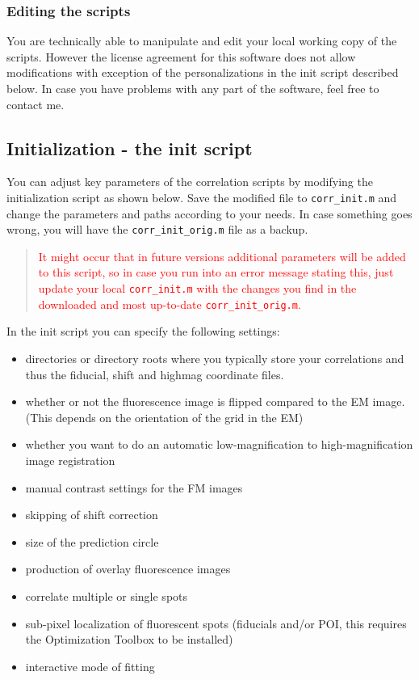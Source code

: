 \documentclass[10pt,a4paper,onepage,DIV12]{scrartcl}
\begin{document}
\subsubsection*{Editing the scripts}
You are technically able to manipulate and edit your local working copy of the scripts. However the license agreement for this software does not allow modifications with exception of the personalizations in the init script described below. In case you have problems with any part of the software, feel free to contact me.


 \newpage
\subsection{Initialization - the init script}
\label{sec:init}
You can adjust key parameters of the correlation scripts by modifying the initialization script as shown below. Save the modified file to \texttt{corr\_init.m} and change the parameters and paths according to your needs. In case something goes wrong, you will have the \texttt{corr\_init\_orig.m} file as a backup.

\begin{quote}\textcolor{red}{
   It might occur that in future versions additional parameters will be added to this script, so in case you run into an error message stating this, just update your local \texttt{corr\_init.m} with the changes you find in the downloaded and most up-to-date \texttt{corr\_init\_orig.m}.}
 \end{quote}

In the init script you can specify the following settings:
\begin{itemize}
 \item directories or directory roots where you typically store your correlations and thus the fiducial, shift and highmag coordinate files.
 \item whether or not the fluorescence image is flipped compared to the EM image. (This depends on the orientation of the grid in the EM)
 \item whether you want to do an automatic low-magnification to high-magnification image registration
 \item manual contrast settings for the FM images
 \item skipping of shift correction
 \item size of the prediction circle
 \item production of overlay fluorescence images
 \item correlate multiple or single spots
 \item sub-pixel localization of fluorescent spots (fiducials and/or POI, this requires the Optimization Toolbox to be installed)
 \item interactive mode of fitting
\end{itemize}
\end{document}
